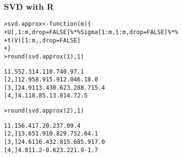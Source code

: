\begin{frame}[fragile]
  \frametitle{SVD with R}

\ungap
\begin{alltt}\small 
{}
> svd.approx <- function (m) \{
+   U[,1:m, drop=FALSE] \%*\% Sigma[1:m,1:m, drop=FALSE] \%*\% 
+   t(V)[1:m,, drop=FALSE]
+ \}
> round(svd.approx(1), 1) \begin{Rout}
     [,1]  [,2] [,3] [,4] [,5] [,6]
[1,] 11.5  52.3 14.1 10.7 40.9  7.1
[2,] 12.9  58.9 15.9 12.0 46.1  8.0
[3,] 24.9 113.4 30.6 23.2 88.7 15.4
[4,]  4.1  18.8  5.1  3.8 14.7  2.5 \end{Rout}
> round(svd.approx(2), 1) \begin{Rout}
     [,1]  [,2] [,3] [,4] [,5] [,6]
[1,] 11.1  56.4 17.2  0.2 37.0  9.4
[2,] 13.6  51.9 10.8 29.7 52.6  4.1
[3,] 24.6 116.4 32.8 15.6 85.9 17.0
[4,]  4.8  11.2 -0.6 23.2 21.9 -1.7 \end{Rout}
\end{alltt}
\end{frame}

